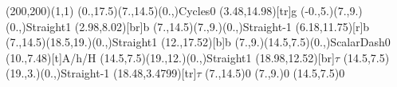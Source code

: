 \documentclass[12pt]{article}
\begin{document}
 \thispagestyle{empty}
	
 \begin{feynartspicture}(200,200)(1,1) 
 \FADiagram{}
\FAProp(0.,17.5)(7.,14.5)(0.,){Cycles}{0}
\FALabel(3.48,14.98)[tr]{g}
\FAProp(-0.,5.)(7.,9.)(0.,){Straight}{1}
\FALabel(2.98,8.02)[br]{b}
\FAProp(7.,14.5)(7.,9.)(0.,){Straight}{-1}
\FALabel(6.18,11.75)[r]{b}
\FAProp(7.,14.5)(18.5,19.)(0.,){Straight}{1}
\FALabel(12.,17.52)[b]{b}
\FAProp(7.,9.)(14.5,7.5)(0.,){ScalarDash}{0}
\FALabel(10.,7.48)[t]{A/h/H}
\FAProp(14.5,7.5)(19.,12.)(0.,){Straight}{1}
\FALabel(18.98,12.52)[br]{$\tau$}
\FAProp(14.5,7.5)(19.,3.)(0.,){Straight}{-1}
\FALabel(18.48,3.4799)[tr]{$\tau$}
\FAVert(7.,14.5){0}
\FAVert(7.,9.){0}
\FAVert(14.5,7.5){0}
 \end{feynartspicture} 
\end{document}
